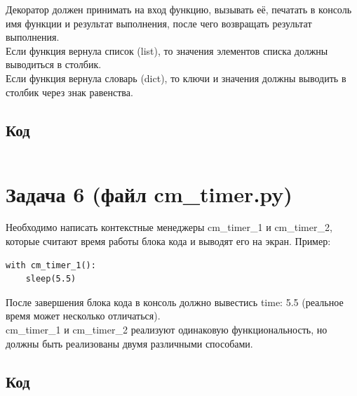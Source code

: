 \documentclass[20pt,a4paper]{report}
\begin{document}
		\qquad Декоратор должен принимать на вход функцию, вызывать её, печатать в консоль имя функции и результат выполнения, после чего возвращать результат выполнения. \\
		\qquad Если функция вернула список (list), то значения элементов списка должны выводиться в столбик. \\
		\qquad Если функция вернула словарь (dict), то ключи и значения должны выводить в столбик через знак равенства. \\

		\subsection{Код}
			\small
			\inputminted[tabsize=4, linenos]{python}{print_result.py}
			\large


		\section{Задача 6 (файл cm\_timer.py)}
		\qquad Необходимо написать контекстные менеджеры cm\_timer\_1 и cm\_timer\_2, которые считают время работы блока кода и выводят его на экран. Пример: \\
		\small
		\begin{verbatim}
with cm_timer_1():
    sleep(5.5)
		\end{verbatim}
		\large
		\qquad После завершения блока кода в консоль должно вывестись time: 5.5 (реальное время может несколько отличаться). \\

		\qquad cm\_timer\_1 и cm\_timer\_2 реализуют одинаковую функциональность, но должны быть реализованы двумя различными способами. \\
		
		\subsection{Код}
			\small
			\inputminted[tabsize=4, linenos]{python}{cm_timer.py}
			\large
\end{document}
